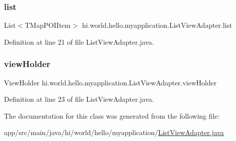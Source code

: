 \subsubsection{\texorpdfstring{list}{list}}
{\footnotesize\ttfamily List$<$T\+Map\+P\+O\+I\+Item$>$ hi.\+world.\+hello.\+myapplication.\+List\+View\+Adapter.\+list\hspace{0.3cm}{\ttfamily [private]}}



Definition at line 21 of file List\+View\+Adapter.\+java.

\mbox{\label{classhi_1_1world_1_1hello_1_1myapplication_1_1_list_view_adapter_a90d289e2054c3deb8a8c2c80abdd5ba1}} 
\subsubsection{\texorpdfstring{viewHolder}{viewHolder}}
{\footnotesize\ttfamily View\+Holder hi.\+world.\+hello.\+myapplication.\+List\+View\+Adapter.\+view\+Holder\hspace{0.3cm}{\ttfamily [private]}}



Definition at line 23 of file List\+View\+Adapter.\+java.



The documentation for this class was generated from the following file\+:\begin{DoxyCompactItemize}
\item 
app/src/main/java/hi/world/hello/myapplication/\mbox{\hyperlink{_list_view_adapter_8java}{List\+View\+Adapter.\+java}}\end{DoxyCompactItemize}
